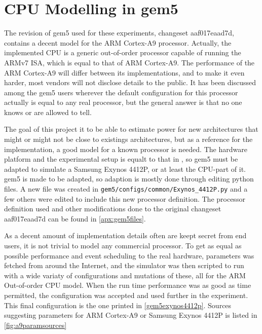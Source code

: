 \section{CPU Modelling in gem5}

The revision of gem5 used for these experiments, changeset aaf017eaad7d,
contains a decent model for the ARM Cortex-A9 processor. Actually, the
implemented CPU is a generic out-of-order processor capable of running the ARMv7
ISA, which is equal to that of ARM Cortex-A9\cite{armtech}. The performance of
the ARM Cortex-A9 will differ between its implementations, and to make it even
harder, most vendors will not disclose details to the public. It has been
discussed among the gem5 users wherever the default configuration for this
processor actually is equal to any real processor\cite{a15maillist}, but the
general answer is that no one knows or are allowed to tell.

The goal of this project it to be able to estimate power for new architectures
that might or might not be close to existings architectures, but as a reference
for the implementation, a good model for a known processor is needed. The
hardware platform and the experimental setup is equalt to that in
\cite{rundehvatum2013exploring}, so gem5 must be adapted to simulate a Samsung
Exynos 4412P, or at least the CPU-part of it.  gem5 is made to be adapted, so
adaption is mostly done through editing python files. A new file was created in
\texttt{gem5/configs/common/Exynos\_4412P.py} and a few others were edited to
include this new processor definition. The processor definition used and other
modifications done to the original changeset aaf017eaad7d can be found in
\autoref{apx:gem5files}.

As a decent amount of implementation details often are keept secret from end users, it
is not trivial to model any commercial processor. To get as equal as possible performance
and event scheduling to the real hardware, parameters was fetched from around the Internet,
and the simulator was then scripted to run with a wide variaty of configurations and
mutations of these, all for the ARM Out-of-order CPU model. When the run time performance was
as good as time permitted, the configuration was accepted and used further in the experiment.
This final configuration is the one printed in \autoref{gem5exynos4412p}. Sources suggesting
parameters for ARM Cortex-A9 or Samsung Exynos 4412P is listed in \autoref{fig:a9paramsources}

